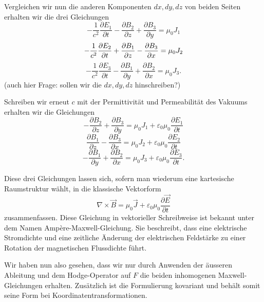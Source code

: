 Vergleichen wir nun die anderen Komponenten $dx,dy,dz$ von beiden Seiten erhalten wir die drei Gleichungen
\begin{equation}
	-\frac{1}{c^2}\frac{\partial E_1}{\partial t} - \frac{\partial B_2}{\partial z} + \frac{\partial B_3}{\partial y} = \mu_0 J_1
\end{equation}
\begin{equation}
	-\frac{1}{c^2}\frac{\partial E_2}{\partial t} + \frac{\partial B_1}{\partial z} - \frac{\partial B_3}{\partial x} = \mu_0 J_2\\
\end{equation}
\begin{equation}
	 -\frac{1}{c^2}\frac{\partial E_3}{\partial t} - \frac{\partial B_1}{\partial y} + \frac{\partial B_2}{\partial x} = \mu_0 J_3.
\end{equation}
(auch hier Frage: sollen wir die $dx,dy,dz$ hinschreiben?)

Schreiben wir erneut $c$ mit der Permittivität und Permeabilität des Vakuums erhalten wir die Gleichungen
\begin{equation}
	 - \frac{\partial B_2}{\partial z} + \frac{\partial B_3}{\partial y} = \mu_0 J_1 + \varepsilon_0\mu_0\frac{\partial E_1}{\partial t}
\end{equation}
\begin{equation}
 	\frac{\partial B_1}{\partial z} - \frac{\partial B_3}{\partial x} = \mu_0 J_2	+ \varepsilon_0\mu_0\frac{\partial E_2}{\partial t}
\end{equation}
\begin{equation}
	 - \frac{\partial B_1}{\partial y} + \frac{\partial B_2}{\partial x} = \mu_0 J_3 + \varepsilon_0\mu_0\frac{\partial E_3}{\partial t}.
\end{equation}

Diese drei Gleichungen lassen sich, sofern man wiederum eine kartesische Raumstruktur wählt, in die klassische Vektorform 
\begin{equation}
	\nabla \times \vec{B} = \mu_0 \vec{J} + \varepsilon_0 \mu_0 \frac{\partial \vec{E}}{\partial t}
\end{equation}
zusammenfassen.
Diese Gleichung in vektorieller Schreibweise ist bekannt unter dem Namen Ampère-Maxwell-Gleichung.
Sie beschreibt, dass eine elektrische Stromdichte und eine zeitliche Änderung der elektrischen Feldstärke zu einer Rotation der magnetischen Flussdichte führt.

Wir haben nun also gesehen, dass wir nur durch Anwenden der äusseren Ableitung und dem Hodge-Operator auf $F$ die beiden inhomogenen Maxwell-Gleichungen erhalten. Zusätzlich ist die Formulierung kovariant und behält somit seine Form bei Koordinatentransformationen.
